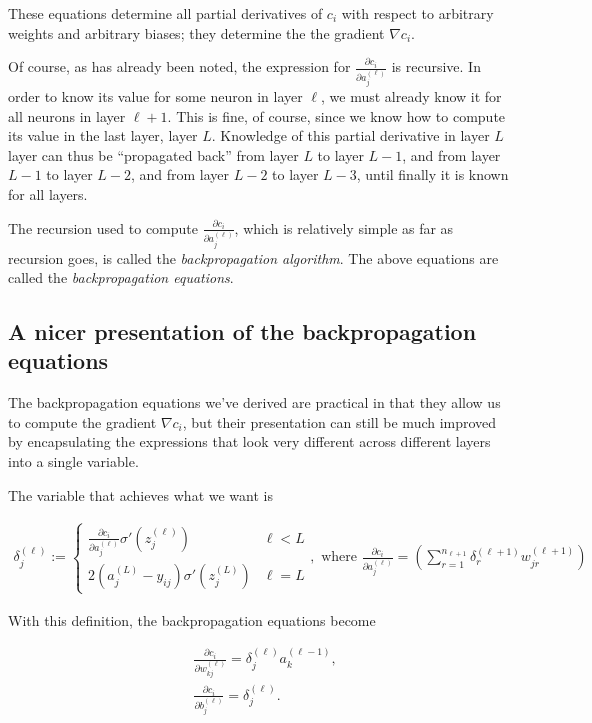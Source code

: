 \documentclass{article}
\begin{document}
	These equations determine all partial derivatives of $c_i$ with respect to arbitrary weights and arbitrary biases; they determine the the gradient $\nabla c_i$.
	
	Of course, as has already been noted, the expression for $\frac{\partial c_i}{\partial a^{(\ell)}_j}$ is recursive. In order to know its value for some neuron in layer $\ell$, we must already know it for all neurons in layer $\ell + 1$. This is fine, of course, since we know how to compute its value in the last layer, layer $L$. Knowledge of this partial derivative in layer $L$ layer can thus be ``propagated back'' from layer $L$ to layer $L - 1$, and from layer $L - 1$ to layer $L - 2$, and from layer $L - 2$ to layer $L - 3$, until finally it is known for all layers.
	
	The recursion used to compute $\frac{\partial c_i}{\partial a^{(\ell)}_j}$, which is relatively simple as far as recursion goes, is called the \textit{backpropagation algorithm}. The above equations are called the \textit{backpropagation equations}.
	
	\subsection*{A nicer presentation of the backpropagation equations}
	
	The backpropagation equations we've derived are practical in that they allow us to compute the gradient $\nabla c_i$, but their presentation can still be much improved by encapsulating the expressions that look very different across different layers into a single variable.
	
	The variable that achieves what we want is 

	\begin{align*}
		\delta^{(\ell)}_j := 
		\begin{cases}
			\frac{\partial c_i}{\partial a^{(\ell)}_j} \sigma'(z^{(\ell)}_j) & \ell < L \\
			2(a^{(L)}_j - y_{ij}) \sigma'(z^{(L)}_j) & \ell = L
		\end{cases},
		\text{ where }
		\frac{\partial c_i}{\partial a^{(\ell)}_j} = \left( \sum_{r = 1}^{n_{\ell+1}} \delta^{(\ell + 1)}_r w^{(\ell + 1)}_{jr} \right)
	\end{align*}

	With this definition, the backpropagation equations become
	
	\begin{align*}
		&\frac{\partial c_i}{\partial w^{(\ell)}_{kj}} = \delta^{(\ell)}_j a^{(\ell - 1)}_k, \\
		&\frac{\partial c_i}{\partial b^{(\ell)}_j} = \delta^{(\ell)}_j.
	\end{align*}
	
\end{document}
